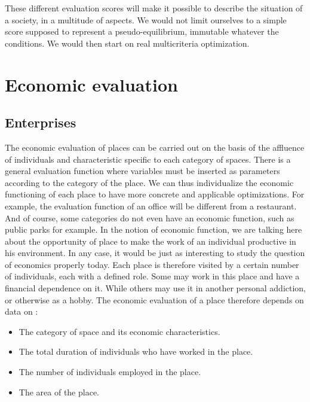 These different evaluation scores will make it possible to describe the situation of a society, in a multitude of aspects. We would not limit ourselves to a simple score supposed to represent a pseudo-equilibrium, immutable whatever the conditions. We would then start on real multicriteria optimization.\\

\newpage

\section{Economic evaluation}

\subsection{Enterprises}

The economic evaluation of places can be carried out on the basis of the affluence of individuals and characteristic specific to each category of spaces. There is a general evaluation function where variables must be inserted as parameters according to the category of the place. We can thus individualize the economic functioning of each place to have more concrete and applicable optimizations. For example, the evaluation function of an office will be different from a restaurant. And of course, some categories do not even have an economic function, such as public parks for example. In the notion of economic function, we are talking here about the opportunity of place to make the work of an individual productive in his environment. In any case, it would be just as interesting to study the question of economics properly today. Each place is therefore visited by a certain number of individuals, each with a defined role. Some may work in this place and have a financial dependence on it. While others may use it in another personal addiction, or otherwise as a hobby. The economic evaluation of a place therefore depends on data on :\\

\begin{itemize}
\item The category of space and its economic characteristics.
\item The total duration of individuals who have worked in the place.
\item The number of individuals employed in the place.
\item The area of the place.\\
\end{itemize}

